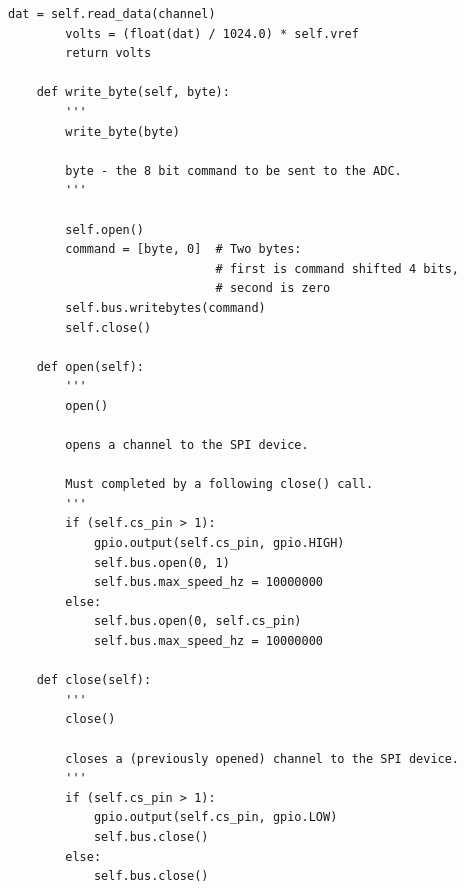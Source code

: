 \documentclass[twoside,a4]{report}
\begin{document}
\begin{Verbatim}[frame=single,fontsize=\footnotesize]
		dat = self.read_data(channel)
		volts = (float(dat) / 1024.0) * self.vref
		return volts
	
	def write_byte(self, byte):
		'''
		write_byte(byte)
		
		byte - the 8 bit command to be sent to the ADC.
		'''
		
		self.open()
		command = [byte, 0]  # Two bytes:
		                     # first is command shifted 4 bits, 
		                     # second is zero
		self.bus.writebytes(command)
		self.close()
	
	def open(self):
		'''
		open()
		
		opens a channel to the SPI device.
		
		Must completed by a following close() call.
		'''
		if (self.cs_pin > 1):
			gpio.output(self.cs_pin, gpio.HIGH)
			self.bus.open(0, 1)
			self.bus.max_speed_hz = 10000000
		else:
			self.bus.open(0, self.cs_pin)
			self.bus.max_speed_hz = 10000000
	
	def close(self):
		'''
		close()
		
		closes a (previously opened) channel to the SPI device.
		'''
		if (self.cs_pin > 1):
			gpio.output(self.cs_pin, gpio.LOW)
			self.bus.close()
		else:
			self.bus.close()
\end{Verbatim}
\end{document}
